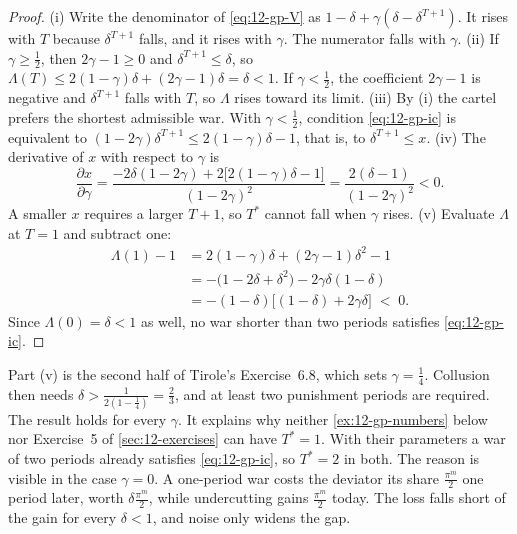 \begin{proof}
(i) Write the denominator of \eqref{eq:12-gp-V} as $1 - \delta + \gamma(\delta - \delta^{T + 1})$. It rises with
$T$ because $\delta^{T + 1}$ falls, and it rises with $\gamma$. The numerator falls with $\gamma$. (ii) If
$\gamma \ge \frac{1}{2}$, then $2\gamma - 1 \ge 0$ and $\delta^{T + 1} \le \delta$, so
$\Lambda(T) \le 2(1 - \gamma)\delta + (2\gamma - 1)\delta = \delta < 1$. If $\gamma < \frac{1}{2}$, the coefficient
$2\gamma - 1$ is negative and $\delta^{T + 1}$ falls with $T$, so $\Lambda$ rises toward its limit. (iii) By (i) the
cartel prefers the shortest admissible war. With $\gamma < \frac{1}{2}$, condition \eqref{eq:12-gp-ic} is
equivalent to $(1 - 2\gamma)\delta^{T + 1} \le 2(1 - \gamma)\delta - 1$, that is, to $\delta^{T + 1} \le x$.
(iv) The derivative of $x$ with respect to $\gamma$ is
\begin{equation*}
\frac{\partial x}{\partial \gamma} = \frac{-2\delta(1 - 2\gamma) + 2\bigl[2(1 - \gamma)\delta - 1\bigr]}{(1 - 2\gamma)^2}
= \frac{2(\delta - 1)}{(1 - 2\gamma)^2} < 0 .
\end{equation*}
A smaller $x$ requires a larger $T + 1$, so $T^*$ cannot fall when $\gamma$ rises. (v) Evaluate $\Lambda$ at $T = 1$
and subtract one:
\begin{align*}
\Lambda(1) - 1 &= 2(1 - \gamma)\delta + (2\gamma - 1)\delta^2 - 1 \\
&= -\bigl(1 - 2\delta + \delta^2\bigr) - 2\gamma\delta(1 - \delta) \\
&= -(1 - \delta)\bigl[(1 - \delta) + 2\gamma\delta\bigr] \;<\; 0 .
\end{align*}
Since $\Lambda(0) = \delta < 1$ as well, no war shorter than two periods satisfies \eqref{eq:12-gp-ic}.
\end{proof}

Part (v) is the second half of Tirole's Exercise~6.8, which sets $\gamma = \frac{1}{4}$. Collusion then needs
$\delta > \frac{1}{2(1 - \frac{1}{4})} = \frac{2}{3}$, and at least two punishment periods are required. The result
holds for every $\gamma$. It explains why neither \cref{ex:12-gp-numbers} below nor Exercise~5 of
\cref{sec:12-exercises} can have $T^* = 1$. With their parameters a war of two periods already satisfies
\eqref{eq:12-gp-ic}, so $T^* = 2$ in both. The reason is visible in the case $\gamma = 0$. A one-period war costs the deviator its share
$\frac{\pi^m}{2}$ one period later, worth $\delta\frac{\pi^m}{2}$, while undercutting gains $\frac{\pi^m}{2}$ today. The
loss falls short of the gain for every $\delta < 1$, and noise only widens the gap.

